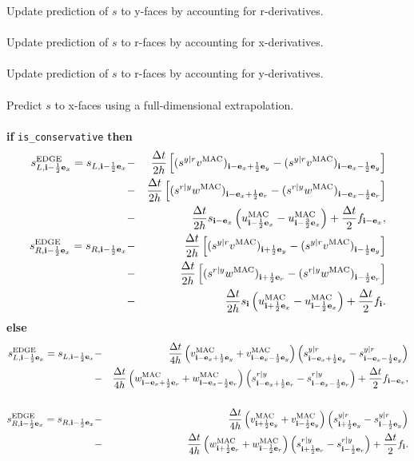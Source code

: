 Update prediction of $s$ to y-faces by accounting for r-derivatives.\\ \\
Update prediction of $s$ to r-faces by accounting for x-derivatives.\\ \\
Update prediction of $s$ to r-faces by accounting for y-derivatives.\\ \\
Predict $s$ to x-faces using a full-dimensional extrapolation.\\ \\
{\bf if} {\tt is\_conservative} {\bf then}
\begin{eqnarray}
s_{L,{\bf i}-\frac{1}{2}{\bf e}_x}^{\rm EDGE} = s_{L,{\bf i}-\frac{1}{2}{\bf e}_x} &-& \frac{\Delta t}{2h}\left[(s^{y|r}v^{\rm MAC})_{{\bf i}-{\bf e}_x+\frac{1}{2}{\bf e}_y}-({s^{y|r}v^{\rm MAC})_{{\bf i}-{\bf e}_x-\frac{1}{2}{\bf e}_y}}\right] \nonumber \\
&-& \frac{\Delta t}{2h}\left[(s^{r|y}w^{\rm MAC})_{{\bf i}-{\bf e}_x+\frac{1}{2}{\bf e}_r}-({s^{r|y}w^{\rm MAC})_{{\bf i}-{\bf e}_x-\frac{1}{2}{\bf e}_r}}\right] \nonumber \\
&-& \frac{\Delta t}{2h}s_{{\bf i}-{\bf e}_x}\left(u_{{\bf i}-\frac{1}{2}{\bf e}_x}^{\rm MAC}-u_{{\bf i}-\frac{3}{2}{\bf e}_x}^{\rm MAC}\right) + \frac{\Delta t}{2}f_{{\bf i}-{\bf e}_x}, \\
s_{R,{\bf i}-\frac{1}{2}{\bf e}_x}^{\rm EDGE} = s_{R,{\bf i}-\frac{1}{2}{\bf e}_x} &-& \frac{\Delta t}{2h}\left[(s^{y|r}v^{\rm MAC})_{{\bf i}+\frac{1}{2}{\bf e}_y}-({s^{y|r}v^{\rm MAC})_{{\bf i}-\frac{1}{2}{\bf e}_y}}\right] \nonumber \\
&-& \frac{\Delta t}{2h}\left[(s^{r|y}w^{\rm MAC})_{{\bf i}+\frac{1}{2}{\bf e}_r}-({s^{r|y}w^{\rm MAC})_{{\bf i}-\frac{1}{2}{\bf e}_r}}\right] \nonumber \\
&-& \frac{\Delta t}{2h}s_{{\bf i}}\left(u_{{\bf i}+\frac{1}{2}{\bf e}_x}^{\rm MAC}-u_{{\bf i}-\frac{1}{2}{\bf e}_x}^{\rm MAC}\right) + \frac{\Delta t}{2}f_{{\bf i}}.
\end{eqnarray}
{\bf else}
\begin{eqnarray}
s_{L,{\bf i}-\frac{1}{2}{\bf e}_x}^{\rm EDGE} = s_{L,{\bf i}-\frac{1}{2}{\bf e}_x} &-& \frac{\Delta t}{4h}\left(v_{{\bf i}-{\bf e}_x+\frac{1}{2}{\bf e}_y}^{\rm MAC}+v_{{\bf i}-{\bf e}_x-\frac{1}{2}{\bf e}_y}^{\rm MAC}\right)\left(s_{{\bf i}-{\bf e}_x+\frac{1}{2}{\bf e}_y}^{y|r}-s_{{\bf i}-{\bf e}_x-\frac{1}{2}{\bf e}_y}^{y|r}\right) \nonumber \\
&-& \frac{\Delta t}{4h}\left(w_{{\bf i}-{\bf e}_x+\frac{1}{2}{\bf e}_r}^{\rm MAC}+w_{{\bf i}-{\bf e}_x-\frac{1}{2}{\bf e}_r}^{\rm MAC}\right)\left(s_{{\bf i}-{\bf e}_x+\frac{1}{2}{\bf e}_r}^{r|y}-s_{{\bf i}-{\bf e}_x-\frac{1}{2}{\bf e}_r}^{r|y}\right) + \frac{\Delta t}{2}f_{{\bf i}-{\bf e}_x}, \nonumber \\
&& \\
s_{R,{\bf i}-\frac{1}{2}{\bf e}_x}^{\rm EDGE} = s_{R,{\bf i}-\frac{1}{2}{\bf e}_x} &-& \frac{\Delta t}{4h}\left(v_{{\bf i}+\frac{1}{2}{\bf e}_y}^{\rm MAC}+v_{{\bf i}-\frac{1}{2}{\bf e}_y}^{\rm MAC}\right)\left(s_{{\bf i}+\frac{1}{2}{\bf e}_y}^{y|r}-s_{{\bf i}-\frac{1}{2}{\bf e}_y}^{y|r}\right) \nonumber \\
&-& \frac{\Delta t}{4h}\left(w_{{\bf i}+\frac{1}{2}{\bf e}_r}^{\rm MAC}+w_{{\bf i}-\frac{1}{2}{\bf e}_r}^{\rm MAC}\right)\left(s_{{\bf i}+\frac{1}{2}{\bf e}_r}^{r|y}-s_{{\bf i}-\frac{1}{2}{\bf e}_r}^{r|y}\right) + \frac{\Delta t}{2}f_{{\bf i}}.
\end{eqnarray}
